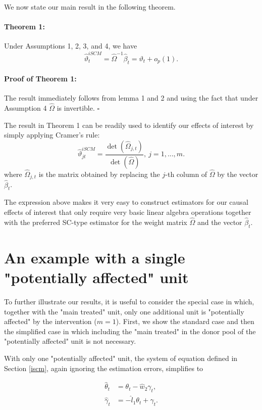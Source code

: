 We now state our main result in the following theorem.

\paragraph{Theorem 1:} Under Assumptions 1, 2, 3, and 4, we have $$\widehat{\vartheta}^{iSCM}_t=\widehat{\Omega}^{-1}\widehat{\beta}_t= \vartheta_t+o_p(1) .$$
\paragraph{Proof of Theorem 1:} The result immediately follows from lemma 1 and 2 and using the fact that under Assumption 4 $\widehat{\Omega}$ is invertible. $\square$


The result in Theorem 1 can be readily used to identify our effects of interest by simply applying Cramer's rule: 
\begin{equation*}
\widehat{\vartheta}^{iSCM}_{jt} = \frac {\det(\widehat{\Omega}_{j,t})}{\det(\widehat{\Omega})}, \  j=1, ... , m.
\end{equation*}
where $\widehat{\Omega}_{j,t}$ is the matrix obtained by replacing the $j$-th column of $\widehat{\Omega}$ by the vector $\widehat{\beta}_t$.


The expression above makes it very easy to construct estimators for our causal effects of interest that only require very basic linear algebra operations together with the preferred SC-type estimator for the weight matrix $\widehat{\Omega}$ and  the vector $\widehat{\beta}_t$. 
\section{An example with a single "potentially affected" unit}\label{m=1}
To further illustrate our results, it is useful to consider the special case in which, together with the "main treated" unit, only one additional unit is "potentially affected" by the intervention ($m=1$). First, we show the standard case and then the simplified case in which including the "main treated" in the donor pool of the "potentially affected" unit is not necessary. 


With only one "potentially affected" unit, the system of equation defined in Section \ref{iscm}, again ignoring the estimation errors, simplifies to 

\begin{align*}
\widehat{\theta}_{t}&=\theta_{t} - \widehat{w}_{2}{\gamma_{t}},\\
\widehat{\gamma}_{t}&=- \widehat{l}_{1}{\theta_{t}} + \gamma_{t}.
\end{align*}



